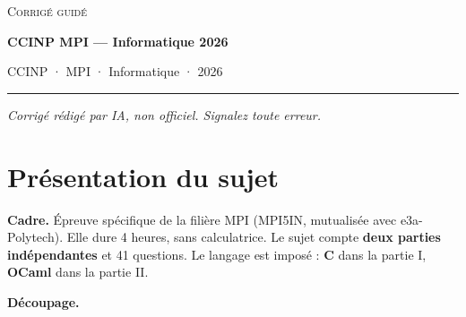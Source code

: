 \documentclass[11pt,a4paper]{article}
\begin{document}
\thispagestyle{plain}
\begin{center}
  {\small\scshape Corrigé guidé}\par\smallskip
  {\LARGE\bfseries CCINP MPI — Informatique 2026\par}\medskip
  {\large CCINP · MPI · Informatique · 2026\par}
\end{center}
\vspace{2pt}\hrule\vspace{8pt}

\emph{Corrigé rédigé par IA, non officiel. Signalez toute erreur.}

\hypertarget{pruxe9sentation-du-sujet}{%
\section{Présentation du sujet}\label{pruxe9sentation-du-sujet}}

\textbf{Cadre.} Épreuve spécifique de la filière MPI (MPI5IN, mutualisée avec e3a-Polytech). Elle dure 4 heures, sans calculatrice. Le sujet compte \textbf{deux parties indépendantes} et 41 questions. Le langage est imposé : \textbf{C} dans la partie I, \textbf{OCaml} dans la partie II.

\textbf{Découpage.}
\end{document}
